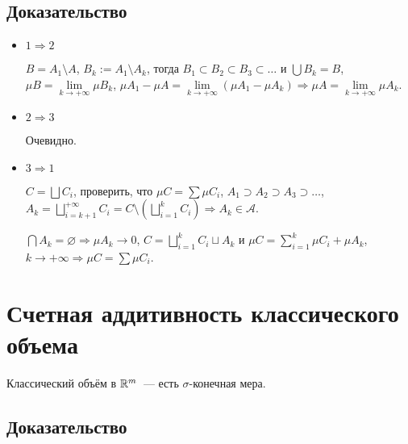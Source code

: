 \documentclass{article}
\begin{document}
        \subsection{Доказательство}
        
            \begin{itemize}
            
                \item $1 \Rightarrow 2$
                
                    $B = A_1 \setminus A$, $B_k := A_1 \setminus A_k$, тогда $B_1 \subset B_2 \subset B_3 \subset \ldots$ и $\bigcup B_k = B$, $\mu B = \lim\limits_{k \rightarrow +\infty} \mu B_k$, $\mu A_1 - \mu A = \lim\limits_{k \rightarrow +\infty} \left( \mu A_1 - \mu A_k \right) \Rightarrow \mu A = \lim\limits_{k \rightarrow +\infty} \mu A_k$.
                    
                \item $2 \Rightarrow 3$
                
                    Очевидно.
                    
                \item $3 \Rightarrow 1$
                
                    $C = \bigsqcup C_i$, проверить, что $\mu C = \sum \mu C_i$, $A_1 \supset A_2 \supset A_3 \supset \ldots$, $A_k = \bigsqcup\limits^{+\infty}_{i = k + 1} C_i = C \setminus \left( \bigsqcup\limits^k_{i = 1} C_i \right) \Rightarrow A_k \in \mathcal{A}$.
                    
                    $\bigcap A_k = \varnothing \Rightarrow \mu A_k \rightarrow 0$, $C = \bigsqcup\limits^k_{i = 1} C_i \sqcup A_k$ и $\mu C = \sum\limits^k_{i = 1} \mu C_i + \mu A_k$, $k \rightarrow +\infty \Rightarrow \mu C = \sum \mu C_i$.
                    
            \end{itemize}
            
    \newpage
    
    \section{Счетная аддитивность классического объема}
    
        Классический объём в $\mathbb{R}^m$~--- есть $\sigma$-конечная мера.
        
        \subsection{Доказательство}
        
\end{document}
